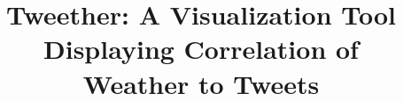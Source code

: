 \documentclass[journal]{vgtc}                %
\title{Tweether: A Visualization Tool Displaying Correlation of \\Weather to Tweets}
\author{}
\begin{document}














\nocite{*}

\end{document}

